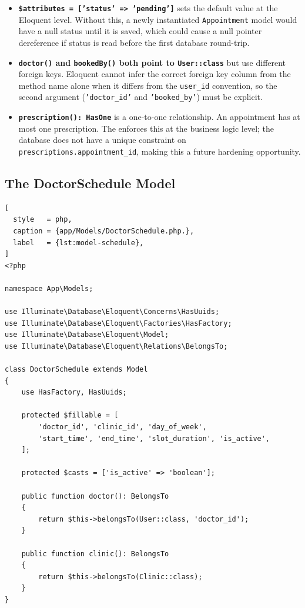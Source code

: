 \begin{itemize}
  \item \textbf{\texttt{\$attributes = ['status' => 'pending']}} sets
    the default value at the Eloquent level. Without this, a newly
    instantiated \texttt{Appointment} model would have a null status
    until it is saved, which could cause a null pointer dereference if
    status is read before the first database round-trip.

  \item \textbf{\texttt{doctor()} and \texttt{bookedBy()} both point to
    \texttt{User::class}} but use different foreign keys. Eloquent
    cannot infer the correct foreign key column from the method name
    alone when it differs from the \texttt{user\_id} convention, so
    the second argument (\texttt{'doctor\_id'} and
    \texttt{'booked\_by'}) must be explicit.

  \item \textbf{\texttt{prescription(): HasOne}} is a one-to-one
    relationship. An appointment has at most one prescription. The
     enforces this at the business
    logic level; the database does not have a unique constraint on
    \texttt{prescriptions.appointment\_id}, making this a future
    hardening opportunity.
\end{itemize}

\subsection{The DoctorSchedule Model}

\begin{lstlisting}[
  style   = php,
  caption = {app/Models/DoctorSchedule.php.},
  label   = {lst:model-schedule},
]
<?php

namespace App\Models;

use Illuminate\Database\Eloquent\Concerns\HasUuids;
use Illuminate\Database\Eloquent\Factories\HasFactory;
use Illuminate\Database\Eloquent\Model;
use Illuminate\Database\Eloquent\Relations\BelongsTo;

class DoctorSchedule extends Model
{
    use HasFactory, HasUuids;

    protected $fillable = [
        'doctor_id', 'clinic_id', 'day_of_week',
        'start_time', 'end_time', 'slot_duration', 'is_active',
    ];

    protected $casts = ['is_active' => 'boolean'];

    public function doctor(): BelongsTo
    {
        return $this->belongsTo(User::class, 'doctor_id');
    }

    public function clinic(): BelongsTo
    {
        return $this->belongsTo(Clinic::class);
    }
}
\end{lstlisting}

